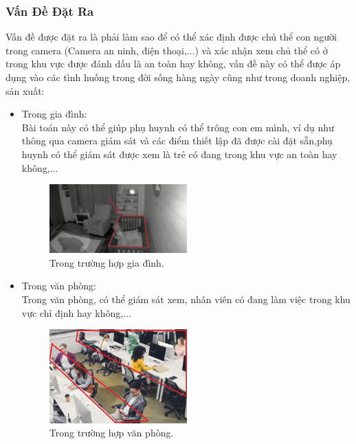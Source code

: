 \begin{flushleft}
    \subsubsection{Vấn Đề Đặt Ra}
    \fontsize{13}{20}\selectfont Vấn đề được đặt ra là phải làm sao để có thể xác định được chủ thể con người trong camera (Camera an ninh, điện thoại,...) và xác nhận xem chủ thể có ở trong khu vực được đánh dấu là an toàn hay không, vấn đề này có thể được áp dụng vào các tình huống trong đời sống hàng ngày cũng như trong doanh nghiệp, sản xuất:\\ 
    \begin{itemize}
        \item Trong gia đình: \\
        Bài toán này có thể giúp phụ huynh có thể trông con em mình, ví dụ như thông qua camera giám sát và các điểm thiết lập đã được cài đặt sẵn,phụ huynh có thể giám sát được xem là trẻ có đang trong khu vực an toàn hay không,...
        \begin{figure}[htbp]
            \centering
            \includegraphics[width=0.5\textwidth]{images/TH1.jpg}
            \caption{Trong trường hợp gia đình.}
            \label{fig:img_1_GD}
        \end{figure}
        \item Trong văn phòng:\\
        Trong văn phòng, có thể giám sát xem, nhân viên có đang làm việc trong khu vực chỉ định hay không,...
        \begin{figure}[htbp]
            \centering
            \includegraphics[width=0.5\textwidth]{images/TH2.jpg}
            \caption{Trong trường hợp văn phòng.}
            \label{fig:img_2_VP}
        \end{figure}

\end{itemize}
\end{flushleft}
